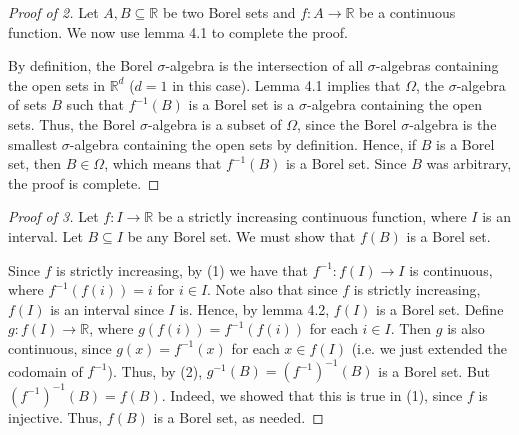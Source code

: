 \begin{proof}[Proof of 2]
Let \( A, B \subseteq \mathbb{R} \) be two Borel sets and \( f: A \to \mathbb{R} \) be a continuous function. We now use lemma 4.1 to complete the proof.

By definition, the Borel \(\sigma\)-algebra is the intersection of all \(\sigma\)-algebras containing the open sets in \( \mathbb{R}^{d}  \) (\( d = 1 \) in this case). Lemma 4.1 implies that \( \Omega \), the \(\sigma\)-algebra of sets \( B \) such that \( f^{-1}(B)  \) is a Borel set is a \(\sigma\)-algebra containing the open sets. Thus, the Borel \(\sigma\)-algebra is a subset of \( \Omega \), since the Borel \(\sigma\)-algebra is the smallest \(\sigma\)-algebra containing the open sets by definition. Hence, if \( B \) is a Borel set, then \( B \in \Omega \), which means that \( f^{-1}(B) \) is a Borel set. Since \( B \) was arbitrary, the proof is complete.
\end{proof}
\begin{proof}[Proof of 3]

Let \( f : I \to \mathbb{R} \) be a strictly increasing continuous function, where \( I \) is an interval. Let \( B \subseteq I \) be any Borel set. We must show that \( f(B) \) is a Borel set.

Since \( f \) is strictly increasing, by (1) we have that \( f^{-1} : f(I) \to I  \) is continuous, where \( f^{-1}(f(i)) = i \) for \( i \in I \). Note also that since \( f \) is strictly increasing, \( f(I) \) is an interval since \( I \) is. Hence, by lemma 4.2, \( f(I) \) is a Borel set. Define \( g : f(I) \to \mathbb{R} \), where \( g(f(i)) = f^{-1}(f(i))  \) for each \( i \in I \). Then \( g \) is also continuous, since \( g(x) = f^{-1}(x)  \) for each \( x \in f(I) \) (i.e. we just extended the codomain of \( f^{-1}  \)). Thus, by (2), \( g^{-1}(B) = (f^{-1})^{-1}(B)  \) is a Borel set. But \( (f^{-1})^{-1}(B) = f(B)  \). Indeed, we showed that this is true in (1), since \( f \) is injective. Thus, \( f(B) \) is a Borel set, as needed.
\end{proof}
